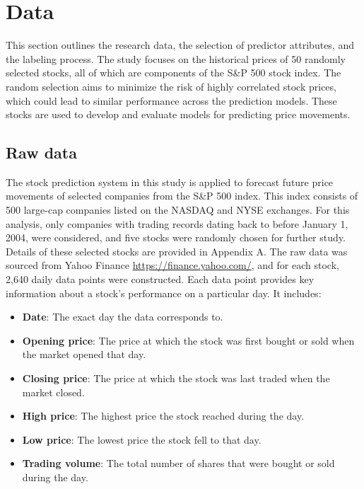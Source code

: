 \documentclass[aodsor,preprint]{imsart}
\numberwithin{equation}{section}
\theoremstyle{plain}
\begin{document}
\section{Data}
This section outlines the research data, the selection of predictor attributes, and the labeling process. The study focuses on the historical prices of 50 randomly selected stocks, all of which are components of the S\&P 500 stock index. The random selection aims to minimize the risk of highly correlated stock prices, which could lead to similar performance across the prediction models. These stocks are used to develop and evaluate models for predicting price movements.

\medskip

\subsection{Raw data} 

The stock prediction system in this study is applied to forecast future price movements of selected companies from the S\&P 500 index. This index consists of 500 large-cap companies listed on the NASDAQ and NYSE exchanges. For this analysis, only companies with trading records dating back to before January 1, 2004, were considered, and five stocks were randomly chosen for further study. Details of these selected stocks are provided in Appendix A. The raw data was sourced from Yahoo Finance \url{https://finance.yahoo.com/}, and for each stock, 2,640 daily data points were constructed. Each data point provides key information about a stock's performance on a particular day. It includes:

\begin{itemize}
    \item \textbf{Date}: The exact day the data corresponds to.
    \item \textbf{Opening price}: The price at which the stock was first bought or sold when the market opened that day.
    \item \textbf{Closing price}: The price at which the stock was last traded when the market closed.
    \item \textbf{High price}: The highest price the stock reached during the day.
    \item \textbf{Low price}: The lowest price the stock fell to that day.
    \item \textbf{Trading volume}: The total number of shares that were bought or sold during the day.
\end{itemize}
\end{document}
